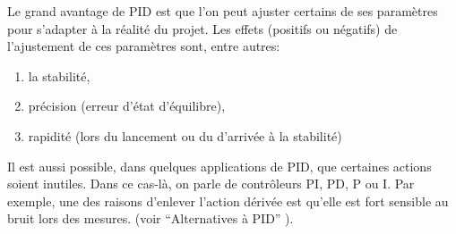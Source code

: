 Le grand avantage de PID est que l'on peut ajuster certains de ses paramètres pour s'adapter à la réalité du projet. Les effets (positifs ou négatifs) de l'ajustement de ces paramètres sont, entre autres: \cite{zhong2006pid}
\begin{enumerate}
\item la stabilité,
\item précision (erreur d'état d'équilibre),
\item rapidité (lors du lancement ou du d'arrivée à la stabilité)
\end{enumerate}

Il est aussi possible, dans quelques applications de PID, que certaines actions soient inutiles. Dans ce cas-là, on parle de contrôleurs PI, PD, P ou I. Par exemple, une des raisons d'enlever l'action dérivée est qu'elle est fort sensible au bruit lors des mesures. (voir ``Alternatives à PID'' ).

\newpage
